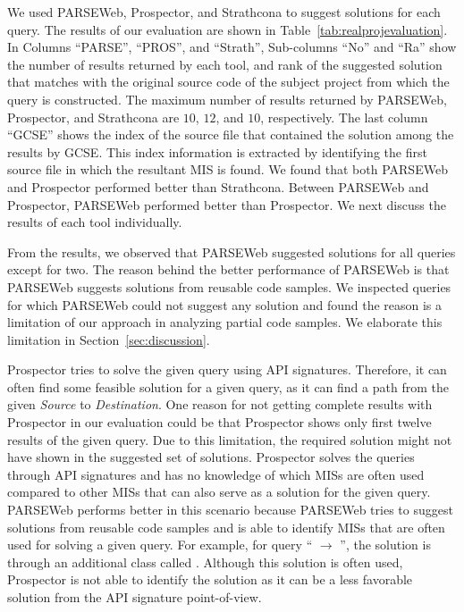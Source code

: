We used PARSEWeb, Prospector, and Strathcona to suggest solutions
for each query. The results of our evaluation are shown in
Table~\ref{tab:realprojevaluation}. 
In Columns ``PARSE'', ``PROS'', and ``Strath'',
Sub-columns ``No'' and ``Ra'' show the
number of results returned by each tool, and rank of the suggested
solution that matches with the original source code of the subject
project from which the query is constructed. The maximum number of
results returned by PARSEWeb, Prospector, and Strathcona are $10$, $12$,
and $10$, respectively. The last column ``GCSE'' shows the index of the
source file that contained the solution among the results by GCSE.
This index information is extracted by identifying the first source
file in which the resultant MIS is found.
We found that both PARSEWeb and Prospector performed better than
Strathcona. Between PARSEWeb and Prospector, PARSEWeb performed
better than Prospector. We next discuss the results of each tool individually.

From the results, we observed that PARSEWeb suggested solutions for all queries except for two.
The reason behind the better performance of PARSEWeb
is that PARSEWeb suggests solutions from reusable code samples.
We inspected queries for which PARSEWeb could not suggest any solution and found the reason
is a limitation of our approach in analyzing partial code samples.
We elaborate this limitation in Section~\ref{sec:discussion}.

Prospector tries to solve the given query using API signatures.
Therefore, it can often find some feasible solution for a given
query, as it can find a path from the given \emph{Source} to
\emph{Destination}. One reason for not getting complete results with
Prospector in our evaluation could be that Prospector shows only
first twelve results of the given query. Due to this limitation, the
required solution might not have shown in the suggested set of
solutions. Prospector solves the queries through API signatures and
has no knowledge of which MISs are often used compared to other
MISs that can also serve as a solution for the given query. PARSEWeb
performs better in this scenario because PARSEWeb tries to suggest
solutions from reusable code samples and is able to identify MISs
that are often used for solving a given query. For example, for
query `` $\rightarrow$ '', the
solution is through an additional class called . Although
this solution is often used, Prospector is not able to identify the
solution as it can be a less favorable solution from the API signature point-of-view.

